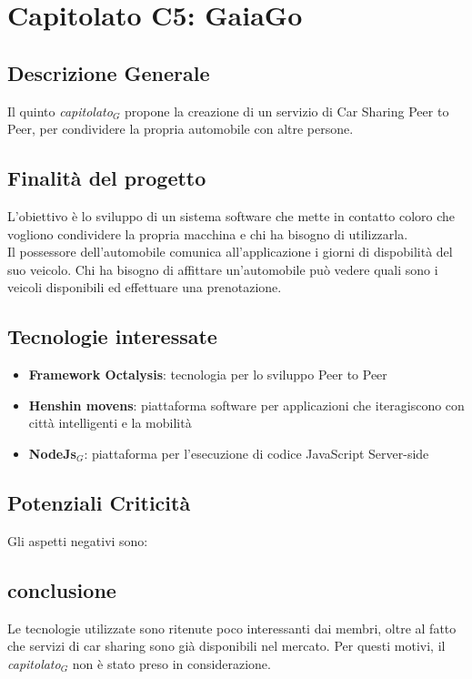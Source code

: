 \chapter{Capitolato C5: GaiaGo}
\section{Descrizione Generale}

Il quinto \textit{capitolato$_{G}$} propone la creazione di un servizio di Car Sharing Peer to Peer, per condividere la propria automobile con altre persone.\\


\section{Finalit\`a del progetto}
L'obiettivo è lo sviluppo di un sistema software che mette in contatto coloro che vogliono condividere la propria macchina e chi ha bisogno di utilizzarla.\\
Il possessore dell'automobile comunica all'applicazione i giorni di dispobilit\`a del suo veicolo.
Chi ha bisogno di affittare un'automobile può vedere quali sono i veicoli disponibili ed effettuare una prenotazione.

\section{Tecnologie interessate}
\begin{itemize}
\item \textbf{Framework Octalysis}: tecnologia per lo sviluppo Peer to Peer
\item \textbf{Henshin movens}: piattaforma software per applicazioni che iteragiscono con città intelligenti e la mobilità
\item \textbf{NodeJs$_{G}$}: piattaforma per l'esecuzione di codice JavaScript Server-side
\end{itemize}
\section{Potenziali Criticità}
Gli aspetti negativi sono:
\section{conclusione}
Le tecnologie utilizzate sono ritenute poco interessanti dai membri, oltre al fatto che servizi di car sharing sono già disponibili nel mercato. Per questi motivi, il \textit{capitolato$_{G}$} non è stato preso in considerazione. 